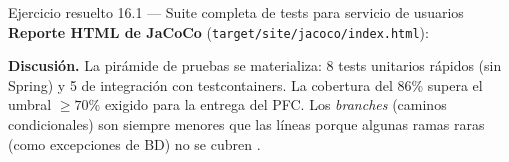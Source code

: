\begin{cajaejemplo}{Ejercicio resuelto 16.1 --- Suite completa de tests para servicio de usuarios}
\textbf{Reporte HTML de JaCoCo} (\texttt{target/site/jacoco/index.html}):

\begin{center}
\end{center}

\textbf{Discusión.} La pirámide de pruebas se materializa: 8 tests
unitarios rápidos (sin Spring) y 5 de integración con
testcontainers. La cobertura del 86\% supera el umbral $\geq 70\%$
exigido para la entrega del PFC. Los \emph{branches} (caminos
condicionales) son siempre menores que las líneas porque algunas
ramas raras (como excepciones de BD) no se cubren
\cite{martin2008clean}.
\end{cajaejemplo}

